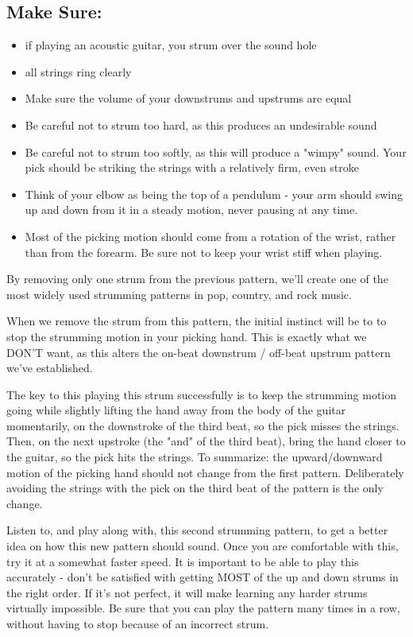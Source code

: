 \subsection{Make Sure:}
\begin{itemize}
\item if playing an acoustic guitar, you strum over the sound hole
\item all strings ring clearly
\item Make sure the volume of your downstrums and upstrums are equal
\item Be careful not to strum too hard, as this produces an undesirable sound
\item Be careful not to strum too softly, as this will produce a "wimpy" sound. Your pick should be striking the strings with a relatively firm, even stroke
\item Think of your elbow as being the top of a pendulum - your arm should swing up and down from it in a steady motion, never pausing at any time.
\item Most of the picking motion should come from a rotation of the wrist, rather than from the forearm. Be sure not to keep your wrist stiff when playing.
\end{itemize}
%
By removing only one strum from the previous pattern, we'll create one of the most widely used strumming patterns in pop, country, and rock music.

When we remove the strum from this pattern, the initial instinct will be to to stop the strumming motion in your picking hand. This is exactly what we DON'T want, as this alters the on-beat downstrum / off-beat upstrum pattern we've established.

The key to this playing this strum successfully is to keep the strumming motion going while slightly lifting the hand away from the body of the guitar momentarily, on the downstroke of the third beat, so the pick misses the strings. Then, on the next upstroke (the "and" of the third beat), bring the hand closer to the guitar, so the pick hits the strings. To summarize: the upward/downward motion of the picking hand should not change from the first pattern. Deliberately avoiding the strings with the pick on the third beat of the pattern is the only change.

Listen to, and play along with, this second strumming pattern, to get a better idea on how this new pattern should sound. Once you are comfortable with this, try it at a somewhat faster speed. It is important to be able to play this accurately - don't be satisfied with getting MOST of the up and down strums in the right order. If it's not perfect, it will make learning any harder strums virtually impossible. Be sure that you can play the pattern many times in a row, without having to stop because of an incorrect strum.

